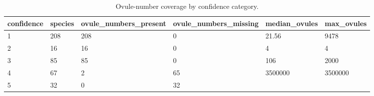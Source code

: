 \begin{table}
\caption{Ovule-number coverage by confidence category.}
\label{tab:confidence_summary}
\begin{adjustbox}{max width=\textwidth}
\begin{tabular}{llllll}
\toprule
confidence & species & ovule\_numbers\_present & ovule\_numbers\_missing & median\_ovules & max\_ovules \\
\midrule
1 & 208 & 208 & 0 & 21.56 & 9478 \\
2 & 16 & 16 & 0 & 4 & 4 \\
3 & 85 & 85 & 0 & 106 & 2000 \\
4 & 67 & 2 & 65 & 3500000 & 3500000 \\
5 & 32 & 0 & 32 &  &  \\
\bottomrule
\end{tabular}
\end{adjustbox}
\end{table}
